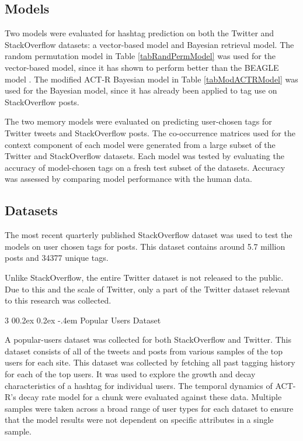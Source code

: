 \documentclass[man,floatsintext,donotrepeattitle]{apa6}
\makeatletter
\renewcommand{\subsubsection}{%
  \@startsection
  {subsubsection}%
  {3}%
  {\parindent}%
  {0\baselineskip \@plus 0.2ex \@minus 0.2ex}%
  {-.4em}%
  {\normalfont\normalsize\bfseries\addperi}}
\makeatother
\begin{document}
\subsection{Models}

Two models were evaluated for hashtag prediction on both the Twitter and StackOverflow datasets: a vector-based model and Bayesian retrieval model.
The random permutation model \parencite{Sahlgren2008} in Table \ref{tabRandPermModel} was used for the vector-based model, since it has shown to perform better than the BEAGLE model \parencite{Recchia2010}.
The modified ACT-R Bayesian model \parencite{Stanley2013} in Table \ref{tabModACTRModel} was used for the Bayesian model, since it has already been applied to tag use on StackOverflow posts.

The two memory models were evaluated on predicting user-chosen tags for Twitter tweets and StackOverflow posts.
The co-occurrence matrices used for the context component of each model were generated from a large subset of the Twitter and StackOverflow datasets.
Each model was tested by evaluating the accuracy of model-chosen tags on a fresh test subset of the datasets.
Accuracy was assessed by comparing model performance with the human data.

\subsection{Datasets}

The most recent quarterly published StackOverflow dataset \parencite{DataDump2014} was used to test the models on user chosen tags for posts.
This dataset contains around \num{5.7} million posts and \num{34377} unique tags.

Unlike StackOverflow, the entire Twitter dataset is not released to the public.
Due to this and the scale of Twitter, only a part of the Twitter dataset relevant to this research was collected.

\subsubsection{Popular Users Dataset}

A popular-users dataset was collected for both StackOverflow and Twitter.
This dataset consists of all of the tweets and posts from various samples of the top users for each site.
This dataset was collected by fetching all past tagging history for each of the top users.
It was used to explore the growth and decay characteristics of a hashtag for individual users.
The temporal dynamics of ACT-R's decay rate model for a chunk were evaluated against these data.
Multiple samples were taken across a broad range of user types for each dataset to ensure that the model results were not dependent on specific attributes in a single sample.
\end{document}

